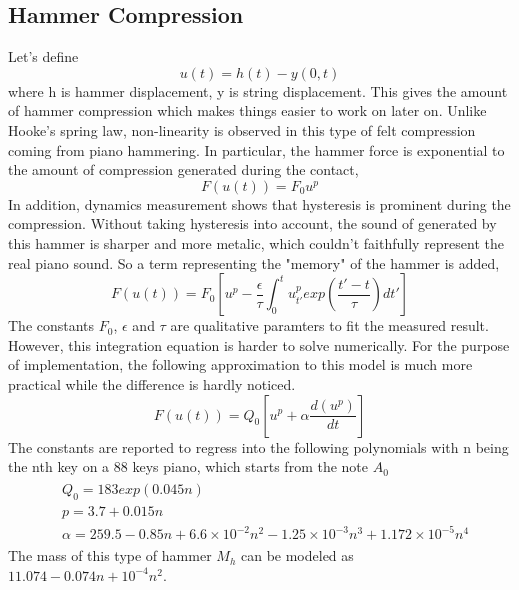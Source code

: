 \documentclass[a4paper,12pt]{article}
\begin{document}
\subsection*{Hammer Compression}
		Let's define \[u(t) = h(t) - y(0, t) \] where h is hammer displacement, y is string displacement. This gives the amount of hammer compression which makes things easier to work on later on. Unlike Hooke's spring law, non-linearity is observed\cite{oldmodel} in this type of felt compression coming from piano hammering. In particular, the hammer force is exponential to the amount of compression generated during the contact,
		\[ F(u(t)) = F_0 u^p \]
		In addition, dynamics measurement shows that hysteresis is prominent during the compression. Without taking hysteresis into account, the sound of generated by this hammer is sharper and more metalic, which couldn't faithfully represent the real piano sound. So a term representing the "memory" of the hammer is added\cite{hammer_and_params},
		\[ F(u(t)) = F_0[u^p - \frac{\epsilon}{\tau} 
		                  \int_0^t u_{t'}^p exp(\frac{t' - t}{\tau}) dt'] \]
	 	The constants $F_0$, $\epsilon$ and $\tau$ are qualitative paramters to fit the measured result. However, this integration equation is harder to solve numerically. For the purpose of implementation, the following approximation to this model is much more practical while the difference is hardly noticed\cite{hammer_and_params}. 
		\[ F(u(t)) = Q_0 [u^p + \alpha \frac{d(u^p)}{dt}] \]
		The constants are reported to regress into the following polynomials\cite{hammer_and_params} with n being the nth key on a 88 keys piano, which starts from the note $A_0$
		\begin{multline}
		\begin{aligned}
		&Q_0 = 183 exp(0.045n) \\
		&p = 3.7 + 0.015n \\
		&\alpha = 259.5 - 0.85n + 6.6 \times 10^{-2} n^2 - 
		         1.25 \times 10^{-3} n^3 + 1.172 \times 10^{-5} n^4
		\end{aligned}
		\end{multline}
		The mass of this type of hammer $M_h$ can be modeled as $11.074 - 0.074n + 10^{-4}n^2$.
\end{document}
